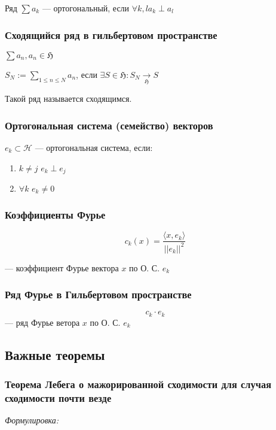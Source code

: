 \documentclass{article}
\def\dbl{\,\,}
\def\goesto#1{\underset{#1}{\longrightarrow}}
\begin{document}
Ряд $\sum a_k$ --- ортогональный, если $\forall k, l a_k \perp a_l$

\subsubsection{Сходящийся ряд в гильбертовом пространстве}

$\sum a_n, a_n \in \mathfrak{H}$

$S_N := \sum_{1 \le n \le N} a_n$, если $\exists S \in \mathfrak{H}: S_N \goesto{\mathfrak{H}} S$

Такой ряд называется сходящимся.

\subsubsection{Ортогональная система (семейство) векторов}

${e_k} \subset \mathcal{H}$ --- ортогональная система, если:

\begin{enumerate}
    \item $k \neq j \dbl e_k \perp e_j$
    \item $\forall k \dbl e_k \neq 0$
\end{enumerate}

\subsubsection{Коэффициенты Фурье}

\[c_k(x) = \frac{\langle x, e_k \rangle}{||e_k||^2}\]

--- коэффициент Фурье вектора $x$ по О. С. $e_k$

\subsubsection{Ряд Фурье в Гильбертовом пространстве}

\[c_k \cdot e_k\]
--- ряд Фурье ветора $x$ по О. С. $e_k$

\newpage

\subsection{Важные теоремы}

\subsubsection{Теорема Лебега о мажорированной сходимости для случая сходимости почти везде}
\textit{Формулировка:}
\end{document}

